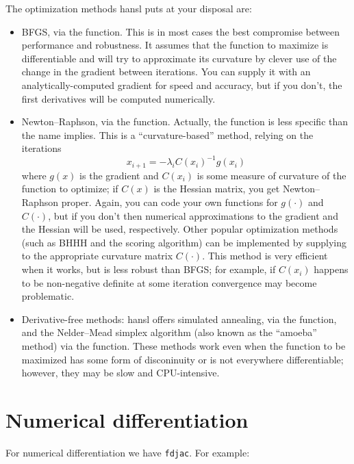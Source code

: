 The optimization methods hansl puts at your disposal are:
\begin{itemize}
\item BFGS, via the  function. This is in most cases
  the best compromise between performance and robustness. It assumes
  that the function to maximize is differentiable and will try to
  approximate its curvature by clever use of the change in the
  gradient between iterations. You can supply it with an
  analytically-computed gradient for speed and accuracy, but if you
  don't, the first derivatives will be computed numerically.
\item Newton--Raphson, via the  function. Actually, the
  function is less specific than the name implies. This is a
  ``curvature-based'' method, relying on the iterations
  \[
    x_{i+1} = -\lambda_i C(x_i)^{-1} g(x_i)
  \]
  where $g(x)$ is the gradient and $C(x_i)$ is some measure of curvature of
  the function to optimize; if $C(x)$ is the Hessian matrix, you get
  Newton--Raphson proper. Again, you can code your own functions for
  $g(\cdot)$ and $C(\cdot)$, but if you don't then numerical approximations
  to the gradient and the Hessian will be used, respectively. Other popular
  optimization methods (such as BHHH and the scoring algorithm) can be
  implemented by supplying to  the appropriate curvature matrix
  $C(\cdot)$. This method is very efficient when it works, but is less
  robust than BFGS; for example, if $C(x_i)$ happens to be non-negative
  definite at some iteration convergence may become problematic.
\item Derivative-free methods: hansl offers simulated annealing, via
  the  function, and the Nelder--Mead simplex algorithm
  (also known as the ``amoeba'' method) via the  function.
  These methods work even when the function to be maximized has some
  form of disconinuity or is not everywhere differentiable; however,
  they may be slow and CPU-intensive.
\end{itemize}

\section{Numerical differentiation}
\label{sec:hp-numdiff}

For numerical differentiation we have \texttt{fdjac}. For example:

